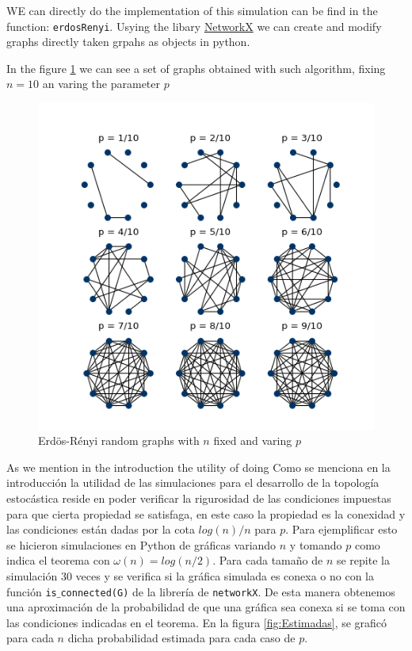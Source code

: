 WE can directly do the implementation of this simulation can be find in the function: \texttt{erdosRenyi}. Usying the libary \href{https://networkx.github.io/}{NetworkX} we can create and modify graphs directly taken grpahs as objects in python.

In the figure \ref{fig:ErdosRenyi10} we can see a set of graphs obtained with such algorithm, fixing $n=10$ an varing the parameter $p$
\begin{figure}[h!]
	\centering
	\includegraphics[scale=1]{Figures/ER-10.png}
	\caption{Erdös-Rényi random graphs with $n$ fixed and varing $p$}
	\label{fig:ErdosRenyi10}
\end{figure}

As we mention in the introduction the utility of doing Como se menciona en la introducción la utilidad de las simulaciones para el desarrollo de la topología estocástica reside en poder verificar la rigurosidad de las condiciones impuestas para que cierta propiedad se satisfaga, en este caso la propiedad es la conexidad y las condiciones están dadas por la cota $log(n)/n$ para $p$. Para ejemplificar esto se hicieron simulaciones en Python de gráficas variando $n$ y tomando $p$ como indica el teorema con $\omega(n)= log(n/2)$. Para cada tamaño de $n$ se repite la simulación 30 veces y se verifica si la gráfica simulada es conexa o no con la función \texttt{is$\_$connected(G)} de la librería de \texttt{networkX}. De esta manera obtenemos una aproximación de la probabilidad de que una gráfica sea conexa si se toma con las condiciones indicadas en el teorema. En la figura \ref{fig:Estimadas}, se graficó para cada $n$ dicha probabilidad estimada para cada caso de $p$.

